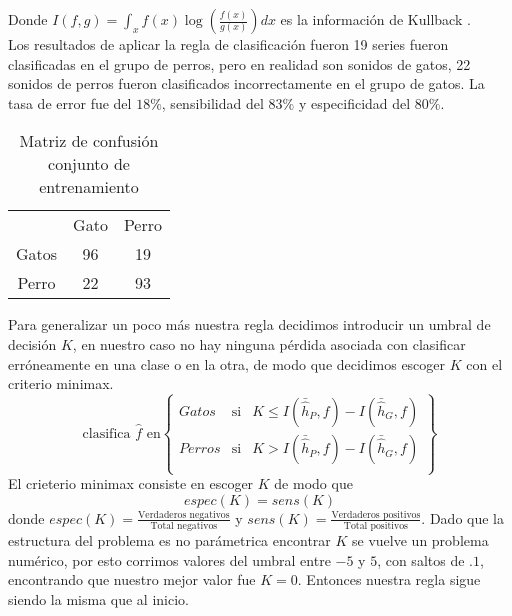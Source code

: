 \documentclass[twocolumn,10pt]{asme2ej}
\begin{document}
Donde $I(f, g)=\int_x f(x)\log(\frac{f(x)}{g(x)})dx$ es la informaci\'on de Kullback \cite{KULLBACK_2}. \\

Los resultados de aplicar la regla de clasificaci\'on fueron 19 series fueron clasificadas en el grupo de perros, pero en realidad son sonidos de gatos, 22 sonidos de perros fueron clasificados incorrectamente en el grupo de gatos. La tasa de error fue del $18\%$, sensibilidad del $83\%$ y especificidad del $80\%$.
\begin{table}[h]
\begin{tabular}{ccc}
 & Gato & Perro\\
 Gatos & 96& 19\\
Perro & 22 & 93\\
\end{tabular}
\caption{Matriz de confusi\'on conjunto de entrenamiento}
\label{tbl:confusion_entre1}
\end{table}

Para generalizar un poco m\'as nuestra regla decidimos introducir un umbral de decisi\'on $K$, en nuestro caso no hay ninguna p\'erdida asociada con clasificar err\'oneamente en una clase o en la otra, de modo que decidimos escoger $K$ con el criterio minimax.\\
$$\text{clasifica } \hat{f} \text{ en}\left\{
\begin{array}{ccc}
Gatos &\text{si}&K\leq I(\bar{\hat{h}}_P, f)-I(\bar{\hat{h}}_G, f)\\
Perros &\text{si}&K> I(\bar{\hat{h}}_P, f)-I(\bar{\hat{h}}_G, f)\\
\end{array}
\right\}$$
El crieterio minimax consiste en escoger $K$ de modo que $$espec(K)=sens(K)$$
donde $espec(K)=\frac{\text{Verdaderos negativos}}{\text{Total negativos}}$ y $sens(K)=\frac{\text{Verdaderos positivos}}{\text{Total positivos}}$. Dado que la estructura del problema es no par\'ametrica encontrar $K$ se vuelve un problema num\'erico, por esto corrimos valores del umbral entre $-5$ y $5$, con saltos de $.1$, encontrando que nuestro mejor valor fue $K=0$. Entonces nuestra regla sigue siendo la misma que al inicio.\\

\end{document}

